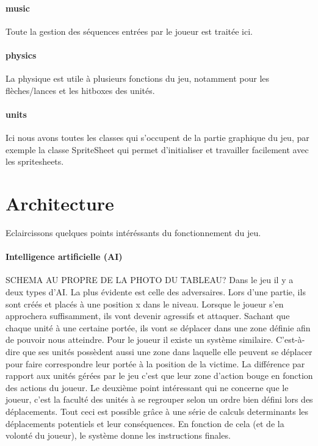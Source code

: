\documentclass[a4paper,10pt]{article}
\begin{document}
  \paragraph{music}
  Toute la gestion des séquences entrées par le joueur est traitée ici.
  \paragraph{physics}
  La physique est utile à plusieurs fonctions du jeu, notamment pour les flèches/lances et les hitboxes des unités.
  \paragraph{units}
  Ici nous avons toutes les classes qui s'occupent de la partie graphique du jeu, par exemple la classe SpriteSheet qui permet d'initialiser et travailler facilement avec les spritesheets.
  
  \pagebreak 
  \section{Architecture}
  Eclaircissons quelques points intéréssants du fonctionnement du jeu.
  \paragraph{Intelligence artificielle (AI)}
  SCHEMA AU PROPRE DE LA PHOTO DU TABLEAU?
  Dans le jeu il y a deux types d'AI. La plus évidente est celle des adversaires. Lors d'une partie, ils sont créés et placés à une position x dans le niveau. Lorsque le joueur s'en approchera suffisamment, ils vont devenir agressifs et attaquer. Sachant que chaque unité à une certaine portée, ils vont se déplacer dans une zone définie afin de pouvoir nous atteindre.
  \newline Pour le joueur il existe un système similaire. C'est-à-dire que ses unités possèdent aussi une zone dans laquelle elle peuvent se déplacer pour faire correspondre leur portée à la position de la victime. La différence par rapport aux unités gérées par le jeu c'est que leur zone d'action bouge en fonction des actions du joueur.
  \newline Le deuxième point intéressant qui ne concerne que le joueur, c'est la faculté des unités à se regrouper selon un ordre bien défini lors des déplacements.
  \newline Tout ceci est possible grâce à une série de calculs determinants les déplacements potentiels et leur conséquences. En fonction de cela (et de la volonté du joueur), le système donne les instructions finales.
  
\end{document}
